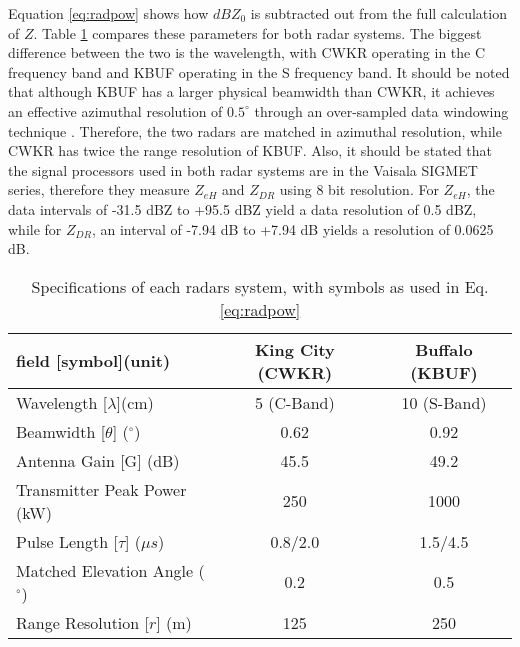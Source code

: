Equation \ref{eq:radpow} shows how $dBZ_0$ is subtracted out from the full calculation of $Z$. Table \ref{radarspecs} compares these parameters for both
radar systems. The biggest difference between the two is the wavelength, with CWKR operating in the C frequency band and KBUF operating in the S frequency
band. It should be noted that although KBUF has a larger physical beamwidth than CWKR, it achieves an effective azimuthal resolution of $0.5^{\circ}$ through
an over-sampled data windowing technique \citep{Torres2007}. Therefore, the two radars are matched in azimuthal resolution, while CWKR has twice the range
resolution of KBUF. Also, it should be stated that the signal processors used in both radar systems are in the Vaisala SIGMET series, therefore they measure
$Z_{eH}$ and $Z_{DR}$ using 8 bit resolution. For $Z_{eH}$, the data intervals of -31.5 dBZ to +95.5 dBZ yield a data resolution of 0.5 dBZ, while for
$Z_{DR}$, an interval of -7.94 dB to +7.94 dB yields a resolution of 0.0625 dB.

\begin{table}[h]
    \caption{Specifications of each radars system, with symbols as used in Eq. \ref{eq:radpow}}\label{radarspecs}
    \begin{center}
    \begin{tabular}{|l|c|c|}
    \hline
     field [symbol](unit) & King City (CWKR) & Buffalo (KBUF) \\
    \hline\hline
    Wavelength [$\lambda$](cm) & 5 (C-Band) & 10 (S-Band) \\
    \hline
    Beamwidth [$\theta$] ($^\circ$)  & 0.62  & 0.92 \\
    \hline
     Antenna Gain [G] (dB) & 45.5 & 49.2 \\
    \hline
     Transmitter Peak Power (kW) & 250 & 1000 \\
    \hline
     Pulse Length [$\tau$] ($\mu s$) &  0.8/2.0 & 1.5/4.5 \\
    \hline
     Matched Elevation Angle ($^\circ$) & 0.2 & 0.5 \\
    \hline
     Range Resolution [$r$] (m)& 125 & 250 \\
    \hline
    \end{tabular}
    \end{center}
\end{table}


